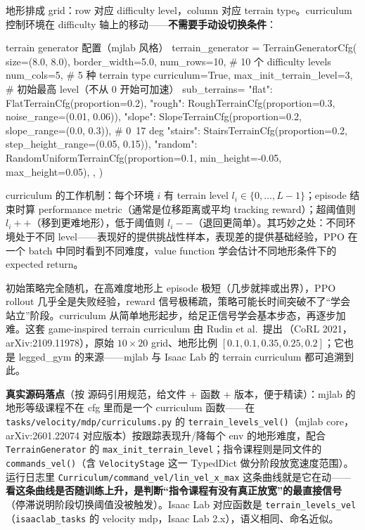地形排成 grid：row 对应 difficulty level，column 对应 terrain type。curriculum 控制环境在 difficulty 轴上的移动——\textbf{不需要手动设切换条件}：

\begin{codebox}[Python]{terrain generator 配置（mjlab 风格）}
terrain_generator = TerrainGeneratorCfg(
    size=(8.0, 8.0), border_width=5.0,
    num_rows=10,                     # 10 个 difficulty levels
    num_cols=5,                      # 5 种 terrain type
    curriculum=True,
    max_init_terrain_level=3,        # 初始最高 level（不从 0 开始可加速）
    sub_terrains={
        "flat":   FlatTerrainCfg(proportion=0.2),
        "rough":  RoughTerrainCfg(proportion=0.3, noise_range=(0.01, 0.06)),
        "slope":  SlopeTerrainCfg(proportion=0.2, slope_range=(0.0, 0.3)),    # 0~17 deg
        "stairs": StairsTerrainCfg(proportion=0.2, step_height_range=(0.05, 0.15)),
        "random": RandomUniformTerrainCfg(proportion=0.1, min_height=-0.05, max_height=0.05),
    },
)
\end{codebox}

curriculum 的工作机制：每个环境 $i$ 有 terrain level $l_i \in \{0,\dots,L-1\}$；episode 结束时算 performance metric（通常是位移距离或平均 tracking reward）；超阈值则 $l_i{+}{+}$（移到更难地形），低于阈值则 $l_i{-}{-}$（退回更简单）。其巧妙之处：不同环境处于不同 level——表现好的提供挑战性样本，表现差的提供基础经验，PPO 在一个 batch 中同时看到不同难度，value function 学会估计不同地形条件下的 expected return。

\begin{insight}\label{ins:rlmc-ql-curriculum}
初始策略完全随机，在高难度地形上 episode 极短（几步就摔或出界），PPO rollout 几乎全是失败经验，reward 信号极稀疏，策略可能长时间突破不了“学会站立”阶段。curriculum 从简单地形起步，给足正信号学会基本步态，再逐步加难。这套 game-inspired terrain curriculum 由 Rudin et al.\ 提出\,\cite{rudin2021minutes}（CoRL 2021，arXiv:2109.11978），原始 $10\times 20$ grid、地形比例 $[0.1,0.1,0.35,0.25,0.2]$；它也是 legged\_gym 的来源——mjlab 与 Isaac Lab 的 terrain curriculum 都可追溯到此。
\end{insight}

\textbf{真实源码落点}（按 源码引用规范，给文件 + 函数 + 版本，便于精读）：mjlab 的地形等级课程不在 cfg 里而是一个 curriculum 函数——在 \verb|tasks/velocity/mdp/curriculums.py| 的 \verb|terrain_levels_vel()|（mjlab core，arXiv:2601.22074 对应版本）按跟踪表现升/降每个 env 的地形难度，配合 \verb|TerrainGenerator| 的 \verb|max_init_terrain_level|；指令课程则是同文件的 \verb|commands_vel()|（含 \verb|VelocityStage| 这一 TypedDict 做分阶段放宽速度范围）。运行日志里 \verb|Curriculum/command_vel/lin_vel_x_max| 这条曲线就是它在动——\textbf{看这条曲线是否随训练上升，是判断“指令课程有没有真正放宽”的最直接信号}（停滞说明阶段切换阈值没被触发）。Isaac Lab 对应函数是 \verb|terrain_levels_vel|（\verb|isaaclab_tasks| 的 velocity mdp，Isaac Lab 2.x），语义相同、命名近似。

